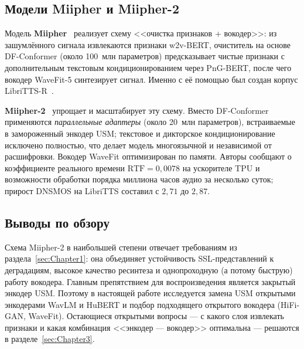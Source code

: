 \subsection{Модели Miipher и Miipher-2}

Модель \textbf{Miipher}~\cite{miipher1} реализует схему <<очистка признаков +
вокодер>>: из зашумлённого сигнала извлекаются признаки w2v-BERT, очиститель на
основе DF-Conformer (около 100~млн параметров) предсказывает чистые признаки с
дополнительным текстовым кондиционированием через PnG-BERT, после чего вокодер
WaveFit-5 синтезирует сигнал. Именно с её помощью был создан корпус
LibriTTS-R~\cite{librittsr}.

\textbf{Miipher-2}~\cite{miipher2} упрощает и масштабирует эту схему. Вместо
DF-Conformer применяются \emph{параллельные адаптеры} (около 20~млн параметров),
встраиваемые в замороженный энкодер USM; текстовое и дикторское
кондиционирование исключено полностью, что делает модель многоязычной и
независимой от расшифровки. Вокодер WaveFit оптимизирован по памяти. Авторы
сообщают о коэффициенте реального времени $\mathrm{RTF} = 0{,}0078$ на ускорителе
TPU и возможности обработки порядка миллиона часов аудио за несколько суток;
прирост DNSMOS на LibriTTS составил с $2{,}71$ до $2{,}87$.

\subsection{Выводы по обзору}

Схема Miipher-2 в наибольшей степени отвечает требованиям из
раздела~\ref{sec:Chapter1}: она объединяет устойчивость SSL-представлений к
деградациям, высокое качество ресинтеза и однопроходную (а потому быструю)
работу вокодера. Главным препятствием для воспроизведения является закрытый
энкодер USM. Поэтому в настоящей работе исследуется замена USM открытыми
энкодерами WavLM и HuBERT и подбор подходящего открытого вокодера (HiFi-GAN,
WaveFit). Остающиеся открытыми вопросы --- с какого слоя извлекать признаки и
какая комбинация <<энкодер — вокодер>> оптимальна --- решаются в
разделе~\ref{sec:Chapter3}.
